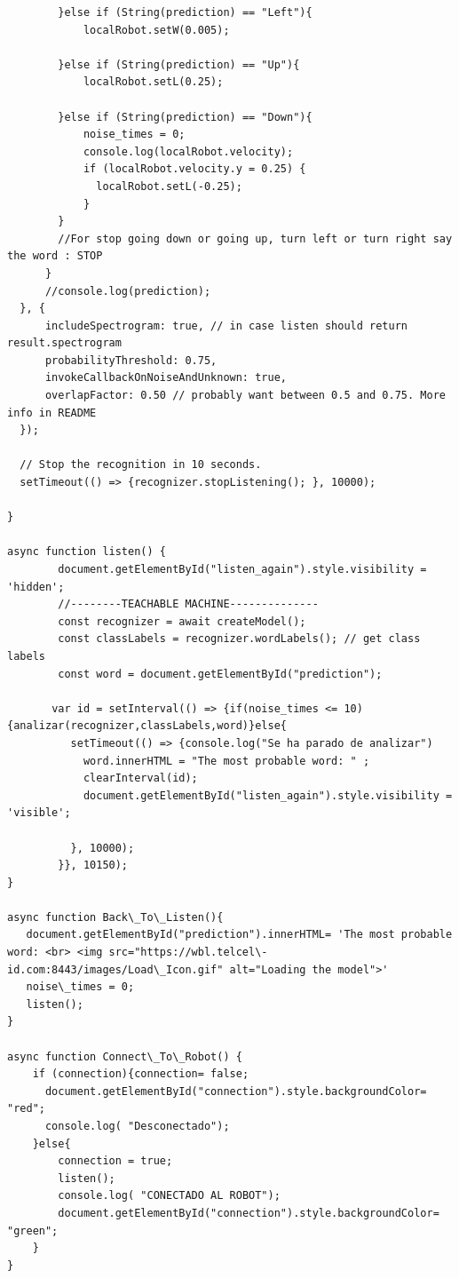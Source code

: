 \begin{lstlisting}
        }else if (String(prediction) == "Left"){
            localRobot.setW(0.005);

        }else if (String(prediction) == "Up"){
            localRobot.setL(0.25);

        }else if (String(prediction) == "Down"){
            noise_times = 0;
            console.log(localRobot.velocity);
            if (localRobot.velocity.y = 0.25) {
              localRobot.setL(-0.25);
            }
        }
        //For stop going down or going up, turn left or turn right say the word : STOP
      }
      //console.log(prediction);
  }, {
      includeSpectrogram: true, // in case listen should return result.spectrogram
      probabilityThreshold: 0.75,
      invokeCallbackOnNoiseAndUnknown: true,
      overlapFactor: 0.50 // probably want between 0.5 and 0.75. More info in README
  });

  // Stop the recognition in 10 seconds.
  setTimeout(() => {recognizer.stopListening(); }, 10000);

}

async function listen() {
        document.getElementById("listen_again").style.visibility = 'hidden';
        //--------TEACHABLE MACHINE--------------
        const recognizer = await createModel();
        const classLabels = recognizer.wordLabels(); // get class labels
        const word = document.getElementById("prediction");
        
       var id = setInterval(() => {if(noise_times <= 10){analizar(recognizer,classLabels,word)}else{
          setTimeout(() => {console.log("Se ha parado de analizar")
            word.innerHTML = "The most probable word: " ;
            clearInterval(id);
            document.getElementById("listen_again").style.visibility = 'visible';

          }, 10000);
        }}, 10150);
}

async function Back\_To\_Listen(){
   document.getElementById("prediction").innerHTML= 'The most probable word: <br> <img src="https://wbl.telcel\-id.com:8443/images/Load\_Icon.gif" alt="Loading the model">'
   noise\_times = 0;
   listen();
}

async function Connect\_To\_Robot() {
    if (connection){connection= false;
      document.getElementById("connection").style.backgroundColor= "red";
      console.log( "Desconectado");
    }else{
        connection = true;
        listen();
        console.log( "CONECTADO AL ROBOT");
        document.getElementById("connection").style.backgroundColor= "green";
    }
}
\end{lstlisting}

